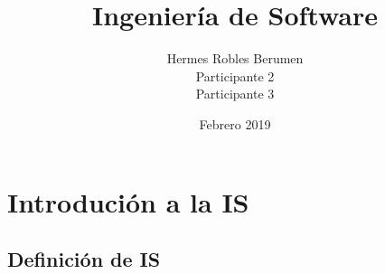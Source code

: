 \documentclass{book}
\title{Ingenier\'ia de Software}
\author{ Hermes Robles Berumen \\ Participante 2 \\ Participante 3 }
\date{Febrero 2019}
\begin{document}
\maketitle

\chapter{Introduci\'on a la IS}

\section{ Definici\'on de IS}



%  

%
\end{document}
